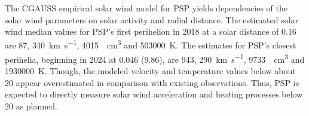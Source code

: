 {The CGAUSS empirical solar wind model for PSP yields dependencies of the solar wind parameters on solar activity and radial distance. The estimated solar wind median values for PSP’s first perihelion in 2018 at a solar distance of \SI{0.16}{\au} are \SI{87}{\nT}, \SI{340}{\km\per\s}, \SI{4015}{\per\cm\cubed} and \SI{503000}{\K}. The estimates for PSP’s closest perihelia, beginning in 2024 at \SI{0.046}{\au} (\SI{9.86}{\Rs}), are \SI{943}{\nT}, \SI{290}{\km\per\s}, \SI{9733}{\per\cm\cubed} and \SI{1930000}{\K}. Though, the modeled velocity and temperature values below about \SI{20}{\Rs} appear overestimated in comparison with existing observations. Thus, PSP is expected to directly measure solar wind acceleration and heating processes below \SI{20}{\Rs} as planned.}	%
{}	%


\maketitle




